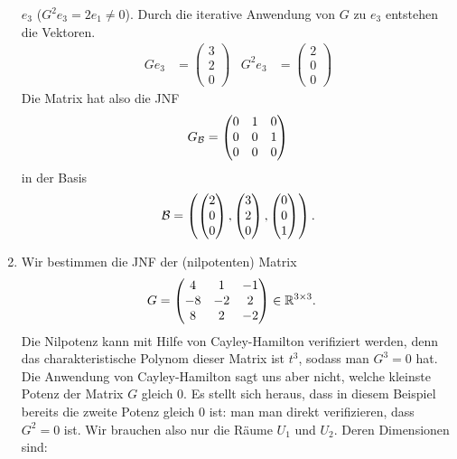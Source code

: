 \begin{bspe}
\begin{enumerate}
			$ e_3 $ ($ G^2e_3 = 2e_1 \neq 0 $). Durch die iterative Anwendung von $G$ zu $e_3$ entstehen die Vektoren. 
			\begin{align*}
				Ge_3 &=  \begin{pmatrix}
					3 \\ 2 \\ 0
				\end{pmatrix} &
				G^2e_3 &= \begin{pmatrix}
					2 \\ 0 \\ 0
				\end{pmatrix}
			\end{align*}
			Die Matrix hat also die JNF 
			\[
			 G_{\mathcal{B}} = \begin{pmatrix}
				0 & 1 & 0 \\
				0 & 0 & 1 \\
				0 & 0 & 0
			\end{pmatrix} 
			\] in der Basis 
			\[ \mathcal{B} = \left( \begin{pmatrix}
				2 \\ 0 \\ 0
			\end{pmatrix}, \begin{pmatrix}
				3 \\ 2 \\ 0
			\end{pmatrix}, \begin{pmatrix}
				0 \\ 0 \\ 1
			\end{pmatrix} \right).
			\]
		\item
			Wir bestimmen die JNF der (nilpotenten) Matrix 
			\begin{align*}
				G &= \begin{pmatrix}
					4 & 1 & -1 \\
					-8 & -2 & 2 \\
					8 & 2 & -2
				\end{pmatrix} \in \mathbb R^{3 \times 3}.
			\end{align*}
			Die Nilpotenz kann mit Hilfe von Cayley-Hamilton verifiziert werden, denn das charakteristische Polynom dieser Matrix ist $t^3$, sodass man $G^3 = 0$ hat. Die Anwendung von Cayley-Hamilton sagt uns aber nicht, welche kleinste Potenz der Matrix $G$ gleich $0$. Es stellt sich heraus, dass in diesem Beispiel bereits die zweite Potenz gleich $0$ ist: man man direkt verifizieren, dass $G^2 = 0$ ist. Wir brauchen also nur die Räume $U_1$ und $U_2$. Deren Dimensionen sind: 

\end{enumerate}
\end{bspe}
